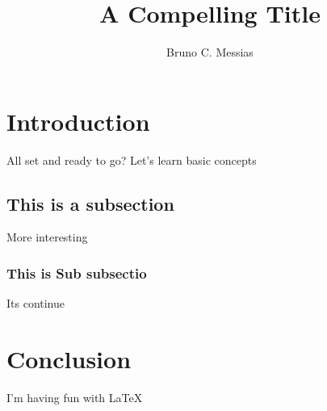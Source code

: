 \documentclass{article}
\title{A Compelling Title}
\author{Bruno C. Messias}
\date{}
\begin{document}
\maketitle

\section{Introduction}

All set and ready to go?
Let's learn basic concepts 

\subsection{This is a subsection}

More interesting

\subsubsection{This is Sub subsectio}

Its continue

\section{Conclusion}

I'm having fun with \LaTeX
\end{document}
